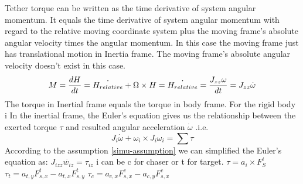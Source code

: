 Tether torque can be written as the time derivative of system angular momentum. It equals the time derivative of system angular momentum with regard to the relative moving coordinate system plus the moving frame's absolute angular velocity times the angular momentum. In this case the moving frame just has translational motion in Inertia frame. The moving frame's absolute angular velocity doesn't exist in this case. 
\begin{equation} M = \frac{dH}{dt} = \dot{H_{relative}} + \Omega \times H\\
		=\dot{H_{relative}} =\frac{J_{zz}\omega}{dt}= J_{zz}\dot{\omega}
\end{equation}
The torque in Inertial frame equals the torque in body frame.
For the rigid body i In the inertial frame, the Euler's equation gives us the relationship between the exerted torque $\tau$ and resulted angular acceleration $\dot{\omega}$ .i.e. 
\begin{equation}
J_i\dot{\omega} + \omega_i \times J_i\omega_i=\sum\tau
\end{equation}
According to the assumption \ref{simu-assumption} we can simplified the Euler's equation as: $J_{izz}\dot{w_{iz}}=\tau_{iz}$	i can be c for chaser or t for target.
$\tau=a_i\times F^i_S$	$\tau_t = a_{t,y}F_{s,x}^t - a_{t,x}F_{s,y}^t$	$\tau_c = a_{c,x}F_{s,x}^c - a_{c,y}F_{s,x}^c$

